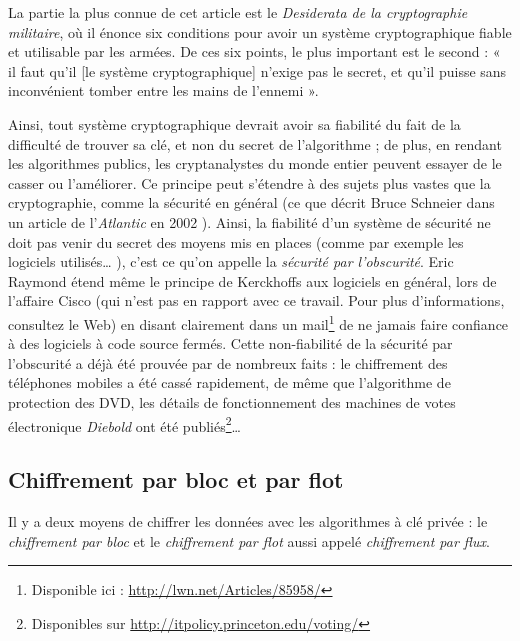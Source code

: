 La partie la plus connue de cet article est le
\emph{Desiderata de la cryptographie militaire}, où il énonce six
conditions pour avoir un système cryptographique fiable et utilisable
par les armées. De ces six points, le plus important est le second : «
il faut qu’il [le système cryptographique] n’exige pas le secret, et
qu’il puisse sans inconvénient tomber entre les mains de l’ennemi
». 

Ainsi, tout système cryptographique devrait avoir sa fiabilité du
fait de la
difficulté de trouver sa clé, et non du secret de l'algorithme ; de
plus, en rendant les algorithmes publics, les cryptanalystes du monde
entier peuvent essayer de le casser ou l'améliorer. Ce principe peut
s'étendre à des sujets plus vastes que la cryptographie, comme la
sécurité en général (ce que décrit Bruce Schneier dans un article de
l'\emph{Atlantic} en 2002 \cite{HomelandInsecurity}). Ainsi, la
fiabilité d'un système de sécurité ne doit pas venir du secret des
moyens mis en places (comme par exemple les logiciels utilisés\dots
), c'est ce qu'on appelle la \emph{sécurité par l'obscurité}. Eric
Raymond étend même le principe de Kerckhoffs aux logiciels en
général,
lors de l'affaire Cisco (qui n'est pas en rapport avec ce travail.
Pour plus d'informations, consultez le Web) en disant clairement dans
un mail\footnote{Disponible ici :
  \url{http://lwn.net/Articles/85958/}} de ne jamais faire confiance à
des logiciels à code source fermés. Cette non-fiabilité de la
sécurité par l'obscurité a déjà été prouvée par de nombreux faits : le
chiffrement des téléphones mobiles a été cassé rapidement, de même que
l'algorithme de protection des DVD, les détails de
fonctionnement des machines de votes électronique \emph{Diebold} ont été
publiés\footnote{Disponibles sur \url{http://itpolicy.princeton.edu/voting/}}\dots

\subsection{Chiffrement par bloc et par flot}
Il y a deux moyens de chiffrer les données avec les algorithmes à clé
privée : le \emph{chiffrement par bloc} et le \emph{chiffrement
par flot} aussi appelé \emph{chiffrement par flux}. \\

